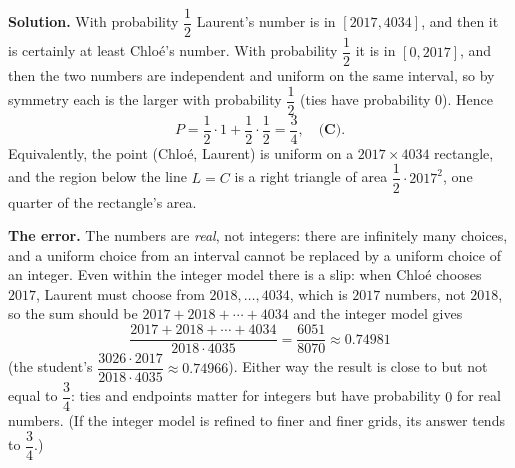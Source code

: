 \textbf{Solution.} With probability $\dfrac{1}{2}$ Laurent's number is in $[2017,4034]$, and then it is certainly at least Chlo\'e's number. With probability $\dfrac{1}{2}$ it is in $[0,2017]$, and then the two numbers are independent and uniform on the same interval, so by symmetry each is the larger with probability $\dfrac{1}{2}$ (ties have probability $0$). Hence
\[
P=\dfrac{1}{2}\cdot1+\dfrac{1}{2}\cdot\dfrac{1}{2}=\boxed{\dfrac{3}{4}},\quad\textbf{(C)}.
\]
Equivalently, the point (Chlo\'e, Laurent) is uniform on a $2017\times4034$ rectangle, and the region below the line $L=C$ is a right triangle of area $\dfrac{1}{2}\cdot2017^2$, one quarter of the rectangle's area.

\textbf{The error.} The numbers are \emph{real}, not integers: there are infinitely many choices, and a uniform choice from an interval cannot be replaced by a uniform choice of an integer. Even within the integer model there is a slip: when Chlo\'e chooses $2017$, Laurent must choose from $2018,\dots,4034$, which is $2017$ numbers, not $2018$, so the sum should be $2017+2018+\cdots+4034$ and the integer model gives
\[
\dfrac{2017+2018+\cdots+4034}{2018\cdot4035}=\dfrac{6051}{8070}\approx0.74981
\]
(the student's $\dfrac{3026\cdot2017}{2018\cdot4035}\approx0.74966$). Either way the result is close to but not equal to $\dfrac{3}{4}$: ties and endpoints matter for integers but have probability $0$ for real numbers. (If the integer model is refined to finer and finer grids, its answer tends to $\dfrac{3}{4}$.)
